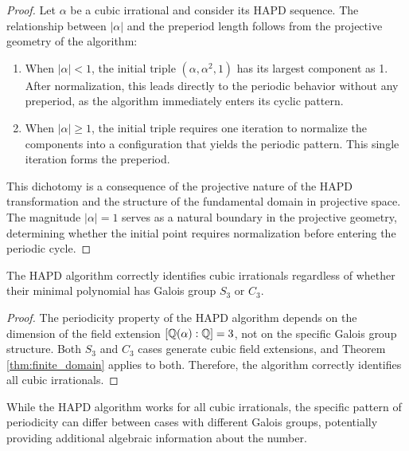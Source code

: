 \begin{proof}
Let $\alpha$ be a cubic irrational and consider its HAPD sequence. The relationship between $|\alpha|$ and the preperiod length follows from the projective geometry of the algorithm:

\begin{enumerate}
    \item When $|\alpha| < 1$, the initial triple $(\alpha, \alpha^2, 1)$ has its largest component as 1. After normalization, this leads directly to the periodic behavior without any preperiod, as the algorithm immediately enters its cyclic pattern.
    
    \item When $|\alpha| \geq 1$, the initial triple requires one iteration to normalize the components into a configuration that yields the periodic pattern. This single iteration forms the preperiod.
\end{enumerate}

This dichotomy is a consequence of the projective nature of the HAPD transformation and the structure of the fundamental domain in projective space. The magnitude $|\alpha| = 1$ serves as a natural boundary in the projective geometry, determining whether the initial point requires normalization before entering the periodic cycle.
\end{proof}

\begin{proposition}\label{prop:galois_behavior}
The HAPD algorithm correctly identifies cubic irrationals regardless of whether their minimal polynomial has Galois group $S_3$ or $C_3$.
\end{proposition}

\begin{proof}
The periodicity property of the HAPD algorithm depends on the dimension of the field extension $[\mathbb{Q}(\alpha):\mathbb{Q}] = 3$, not on the specific Galois group structure. Both $S_3$ and $C_3$ cases generate cubic field extensions, and Theorem \ref{thm:finite_domain} applies to both. Therefore, the algorithm correctly identifies all cubic irrationals.
\end{proof}

\begin{remark}
While the HAPD algorithm works for all cubic irrationals, the specific pattern of periodicity can differ between cases with different Galois groups, potentially providing additional algebraic information about the number.
\end{remark}

